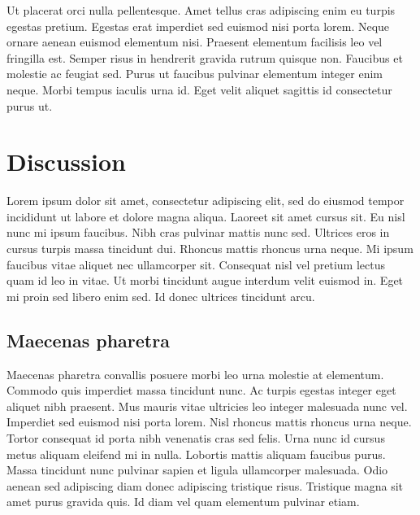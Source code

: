 \documentclass{article}
\begin{document}
Ut placerat orci nulla pellentesque. Amet tellus cras adipiscing enim eu turpis egestas pretium. Egestas erat imperdiet sed euismod nisi porta lorem. Neque ornare aenean euismod elementum nisi. Praesent elementum facilisis leo vel fringilla est. Semper risus in hendrerit gravida rutrum quisque non. Faucibus et molestie ac feugiat sed. Purus ut faucibus pulvinar elementum integer enim neque. Morbi tempus iaculis urna id. Eget velit aliquet sagittis id consectetur purus ut.

\section{Discussion}

Lorem ipsum dolor sit amet, consectetur adipiscing elit, sed do eiusmod tempor incididunt ut labore et dolore magna aliqua. Laoreet sit amet cursus sit. Eu nisl nunc mi ipsum faucibus. Nibh cras pulvinar mattis nunc sed. Ultrices eros in cursus turpis massa tincidunt dui. Rhoncus mattis rhoncus urna neque. Mi ipsum faucibus vitae aliquet nec ullamcorper sit. Consequat nisl vel pretium lectus quam id leo in vitae. Ut morbi tincidunt augue interdum velit euismod in. Eget mi proin sed libero enim sed. Id donec ultrices tincidunt arcu.

\subsection{Maecenas pharetra}

Maecenas pharetra convallis posuere morbi leo urna molestie at elementum. Commodo quis imperdiet massa tincidunt nunc. Ac turpis egestas integer eget aliquet nibh praesent. Mus mauris vitae ultricies leo integer malesuada nunc vel. Imperdiet sed euismod nisi porta lorem. Nisl rhoncus mattis rhoncus urna neque. Tortor consequat id porta nibh venenatis cras sed felis. Urna nunc id cursus metus aliquam eleifend mi in nulla. Lobortis mattis aliquam faucibus purus. Massa tincidunt nunc pulvinar sapien et ligula ullamcorper malesuada. Odio aenean sed adipiscing diam donec adipiscing tristique risus. Tristique magna sit amet purus gravida quis. Id diam vel quam elementum pulvinar etiam.
\end{document}
